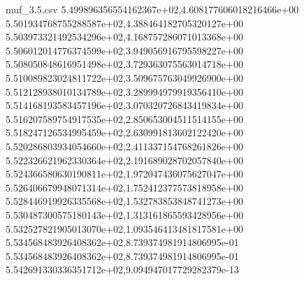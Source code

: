 \begin{filecontents*}{muf_3.5.csv}
5.499896356554162367e+02,4.608177606018216466e+00
5.501934768755288587e+02,4.388464182705320127e+00
5.503973321492534296e+02,4.168757286071013368e+00
5.506012014776374599e+02,3.949056916795598227e+00
5.508050848616951498e+02,3.729363075563014718e+00
5.510089823024811722e+02,3.509675763049926900e+00
5.512128938010134789e+02,3.289994979919356410e+00
5.514168193583457196e+02,3.070320726843419834e+00
5.516207589754917535e+02,2.850653004511514155e+00
5.518247126534995459e+02,2.630991813602122420e+00
5.520286803934054660e+02,2.411337154768261826e+00
5.522326621962330364e+02,2.191689028702057840e+00
5.524366580630190811e+02,1.972047436075627047e+00
5.526406679948071314e+02,1.752412377573818958e+00
5.528446919926335568e+02,1.532783853848741273e+00
5.530487300575180143e+02,1.313161865593428956e+00
5.532527821905013070e+02,1.093546413481817581e+00
5.534568483926408362e+02,8.739374981914806995e-01
5.534568483926408362e+02,8.739374981914806995e-01
5.542691330336351712e+02,9.094947017729282379e-13
\end{filecontents*}

